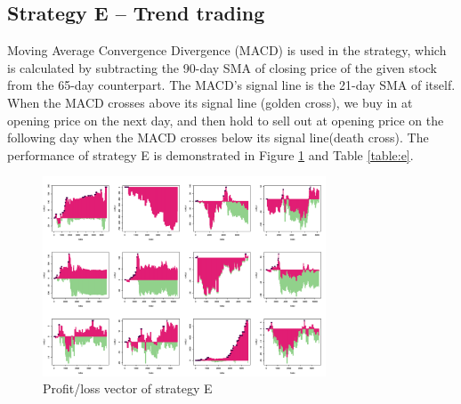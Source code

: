 \documentclass[12pt, letterpaper, oneside]{article}
\begin{document}
\subsection{Strategy E -- Trend trading}
Moving Average Convergence Divergence (MACD) is used in the strategy, which is calculated by subtracting the 90-day SMA of closing price of the given stock from the 65-day counterpart. The MACD's signal line is the 21-day SMA of itself. When the MACD crosses above its signal line (golden cross), we buy in at opening price on the next day, and then hold to sell out at opening price on the following day when the MACD crosses below its signal line(death cross). The performance of strategy E is demonstrated in Figure \ref{fig:e} and Table \ref{table:e}.

\begin{figure}[h]
    \centering
    \includegraphics[width=0.75\textwidth]{se_pl}
    \caption{Profit/loss vector of strategy E}
    \label{fig:e}
\end{figure}
\end{document}
